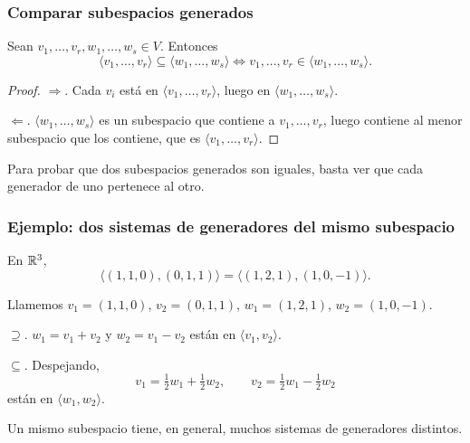 \begin{frame}
    \frametitle{Comparar subespacios generados}

    \begin{proposition}
        Sean $v_1,\ldots,v_r,w_1,\ldots,w_s\in V$. Entonces
        \[
            \langle v_1,\ldots,v_r\rangle\subseteq\langle w_1,\ldots,w_s\rangle
            \iff
            v_1,\ldots,v_r\in\langle w_1,\ldots,w_s\rangle.
        \]
    \end{proposition}

    \begin{proof}
        \alert{$\Rightarrow$.} Cada $v_i$ está en
        $\langle v_1,\ldots,v_r\rangle$, luego en
        $\langle w_1,\ldots,w_s\rangle$.

        \alert{$\Leftarrow$.} $\langle w_1,\ldots,w_s\rangle$ es un subespacio
        que contiene a $v_1,\ldots,v_r$, luego contiene al menor subespacio
        que los contiene, que es $\langle v_1,\ldots,v_r\rangle$.
    \end{proof}

    \medskip

    Para probar que dos subespacios generados son \alert{iguales}, basta
    ver que cada generador de uno pertenece al otro.
\end{frame}

\begin{frame}
    \frametitle{Ejemplo: dos sistemas de generadores del mismo subespacio}

    \begin{example}
        En $\mathbb{R}^3$,
        \[
            \langle(1,1,0),(0,1,1)\rangle=\langle(1,2,1),(1,0,-1)\rangle.
        \]
    \end{example}

    \medskip

    Llamemos $v_1=(1,1,0)$, $v_2=(0,1,1)$, $w_1=(1,2,1)$, $w_2=(1,0,-1)$.

    \medskip

    \alert{$\supseteq$.} $w_1=v_1+v_2$ y $w_2=v_1-v_2$ están en
    $\langle v_1,v_2\rangle$.

    \medskip

    \alert{$\subseteq$.} Despejando,
    \[
        v_1=\tfrac12w_1+\tfrac12w_2,
        \qquad
        v_2=\tfrac12w_1-\tfrac12w_2
    \]
    están en $\langle w_1,w_2\rangle$.

    \medskip

    Un mismo subespacio tiene, en general, \alert{muchos} sistemas de
    generadores distintos.
\end{frame}

